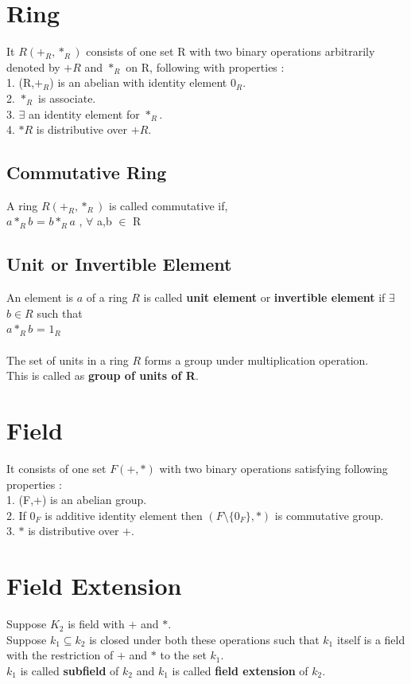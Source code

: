 \documentclass[11pt]{article}
\begin{document}
\section*{Ring}
It $R(+_{R},*_{R})$ consists of one set R with two binary operations arbitrarily denoted by $+{R}$ and $*_{R}$ on R, following with properties : \\
1. (R,$+_{R}$) is an abelian with identity element $0_{R}$. \\
2. $*_{R}$ is associate. \\
3. $\exists$ an identity element for $*_{R}$. \\
4. $*{R}$ is distributive over $+{R}$. \\

\subsection*{Commutative Ring}
A ring $R(+_{R},*_{R})$ is called commutative if, \\
$a *_{R} b$ = $b *_{R} a$ , $\forall$ a,b $\in$ R

\subsection*{Unit or Invertible Element}
An element is $a$ of a ring $R$ is called \textbf{unit element} or \textbf{invertible element} if $\exists$ $ b \in R$ such that \\
$a*_{R}b$ = $1_{R}$ 
\\ \\
The set of units in a ring $R$ forms a group under multiplication operation.\\
This is called as \textbf{group of units of R}.

\section*{Field}
It consists of one set $F(+,*)$ with two binary operations satisfying following properties : \\ 
1. (F,+) is an abelian group. \\
2. If $0_{F}$ is additive identity element then $(F\setminus \{0_{F}\},*)$ is commutative group. \\
3. $*$ is distributive over $+$. \\

\section*{Field Extension}
Suppose $K_{2}$ is field  with $+$ and $*$. \\
Suppose $k_{1} \subseteq k_{2}$ is closed under both these operations such that $k_{1}$ itself is a field with the restriction of $+$ and $*$ to the set $k_{1}$. \\
$k_{1}$ is called \textbf{subfield} of $k_{2}$ and $k_{1}$ is called \textbf{field extension} of $k_{2}$. \\
\end{document}
